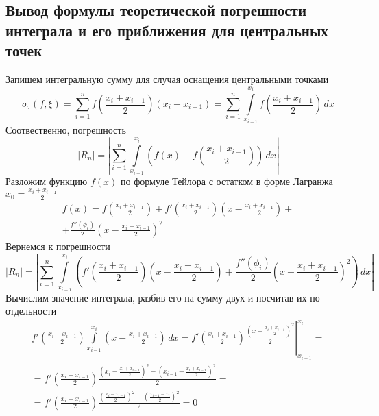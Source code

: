 \documentclass[a5paper, 10pt]{article}
\theoremstyle{definition}
\theoremstyle{plain}
\theoremstyle{remark}
\begin{document}
 \subsection{Вывод формулы теоретической погрешности интеграла и его приближения для центральных точек}
Запишем интегральную сумму для случая оснащения центральными точками
\begin{equation}
\sigma_\tau (f, \xi) = \sum\limits_{i=1}^n f \left( \frac{x_{i} + x_{i-1}}{2} \right)(x_{i} - x_{i-1}) = \sum\limits_{i=1}^n \int\limits_{x_{i-1}}^{x_{i}} f \left(\frac{x_{i} + x_{i-1}}{2} \right) \,dx 
\end{equation}
Соотвественно, погрешность
\begin{equation}
\left|R_n\right| = \left|\sum\limits_{i=1}^n \int\limits_{x_{i-1}}^{x_{i}} \left( f(x) -  f \left( \frac{x_{i} + x_{i-1}}{2} \right) \right) \,dx\right|
\end{equation}
Разложим функцию $f(x)$ по формуле Тейлора с остатком в форме Лагранжа $x_0 = \frac{x_{i} + x_{i-1}}{2}$
\begin{multline}
f(x) = f \left( \frac{x_{i} + x_{i-1}}{2} \right) + f' \left( \frac{x_{i} + x_{i-1}}{2} \right) \left(x - \frac{x_{i} + x_{i-1}}{2} \right) +\\ + \frac{f'' \left(\phi_i \right)}{2} \left(x - \frac{x_{i} + x_{i-1}}{2} \right)^2
\end{multline}
Вернемся к погрешности
\begin{equation}
\left|R_n\right| =\left| \sum\limits_{i=1}^n \int\limits_{x_{i-1}}^{x_{i}} \left( f' \left( \frac{x_{i} + x_{i-1}}{2} \right) \left(x - \frac{x_{i} + x_{i-1}}{2} \right) + \frac{f'' \left(\phi_i \right)}{2} \left(x - \frac{x_{i} + x_{i-1}}{2} \right)^2 \right) \,dx \right| 
\end{equation}
Вычислим значение интеграла, разбив его на сумму двух и посчитав их по отдельности
\begin{multline}
 f' \left( \frac{x_{i} + x_{i-1}}{2} \right) \int\limits_{x_{i-1}}^{x_{i}}  \left(x - \frac{x_{i} + x_{i-1}}{2} \right) \,dx  = \left.  f' \left( \frac{x_{i} + x_{i-1}}{2} \right) \frac{\left(x - \frac{x_{i} + x_{i-1}}{2}\right)^2}{2}  \right|_{x_{i-1}}^{x_{i}} = \\ =  f' \left( \frac{x_{i} + x_{i-1}}{2} \right) \frac{\left(x_{i} - \frac{x_{i} + x_{i-1}}{2}\right)^2 - \left(x_{i-1} - \frac{x_{i} + x_{i-1}}{2}\right)^2}{2} = \\ = f' \left( \frac{x_{i} + x_{i-1}}{2} \right) \frac{\left(\frac{x_{i} - x_{i-1}}{2}\right)^2 - \left( \frac{x_{i-1} - x_{i}}{2}\right)^2}{2} = 0
\end{multline}
\end{document}
